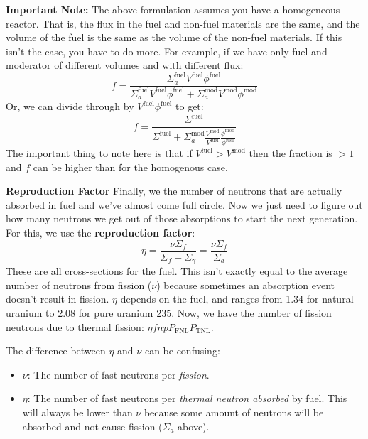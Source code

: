 \documentclass[letter]{article}
\begin{document}
\begin{framed}
\textbf{Important Note:} The above formulation assumes you have a
homogeneous reactor. That is, the flux in the fuel and non-fuel
materials are the same, and the volume of the fuel is the same as the
volume of the non-fuel materials. If this isn't the case, you have to
do more. For example, if we have only fuel and moderator of different
volumes and with different flux:
\begin{equation*}
  f=\frac{\Sigma^{\text{fuel}}_aV^{\text{fuel}}\phi^{\text{fuel}}}{\Sigma^{\text{fuel}}_aV^{\text{fuel}}\phi^{\text{fuel}}+\Sigma^{\text{mod}}_aV^{\text{mod}}\phi^{\text{mod}}}
\end{equation*}
Or, we can divide through by $V^{\text{fuel}}\phi^{\text{fuel}}$ to
get:
\begin{equation*}
  f=\frac{\Sigma^{\text{fuel}}}{\Sigma^{\text{fuel}}+\Sigma^{\text{mod}}_a\frac{V^{\text{mod}}}{V^{\text{fuel}}}\frac{\phi^{\text{mod}}}{\phi^{\text{fuel}}}}
\end{equation*}
The important thing to note here is that if
$V^{\text{fuel}}>V^{\text{mod}}$ then the fraction is $>1$ and $f$ can
be higher than for the homogenous case.
\end{framed}

\textbf{Reproduction Factor}
Finally, we the number of neutrons that are actually absorbed in fuel
and we've almost come full circle. Now we just need to figure out how
many neutrons we get out of those absorptions to start the next
generation. For this, we use the \textbf{reproduction factor}:
\begin{equation*}
  \eta =\frac{\nu\Sigma_f}{\Sigma_f+\Sigma_\gamma}=\frac{\nu\Sigma_f}{\Sigma_a}
\end{equation*}
These are all cross-sections for the fuel. This isn't exactly equal to the average number of neutrons from
fission ($\nu$) because sometimes an absorption event doesn't result
in fission.  $\eta$ depends on
the fuel, and ranges from 1.34 for natural uranium to 2.08 for pure
uranium 235. Now, we have the number of fission neutrons due to
thermal fission: $\eta{}fnpP_{\text{FNL}}P_{\text{TNL}}$.
\begin{framed}
The difference between $\eta$ and $\nu$ can be confusing:
\begin{itemize}
\item $\nu$: The number of fast neutrons per \textit{fission}.
\item $\eta$: The number of fast neutrons per \textit{thermal neutron
    absorbed} by fuel. This will always be lower than $\nu$ because
  some amount of neutrons will be absorbed and not cause fission
  ($\Sigma_a$ above).
\end{itemize}
\end{framed}
\end{document}
